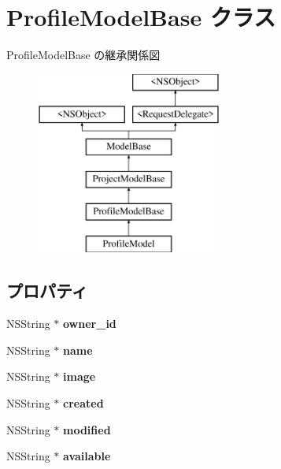\hypertarget{interface_profile_model_base}{}\section{Profile\+Model\+Base クラス}
\label{interface_profile_model_base}
Profile\+Model\+Base の継承関係図\begin{figure}[H]
\begin{center}
\leavevmode
\includegraphics[height=6.000000cm]{interface_profile_model_base}
\end{center}
\end{figure}
\subsection*{プロパティ}
\begin{DoxyCompactItemize}
\item 
\hypertarget{interface_profile_model_base_a549a48724d174bfd47f7c42b907f2b65}{}N\+S\+String $\ast$ {\bfseries owner\+\_\+id}\label{interface_profile_model_base_a549a48724d174bfd47f7c42b907f2b65}

\item 
\hypertarget{interface_profile_model_base_a22ef66a4d154ab4948796f01cd2e72bc}{}N\+S\+String $\ast$ {\bfseries name}\label{interface_profile_model_base_a22ef66a4d154ab4948796f01cd2e72bc}

\item 
\hypertarget{interface_profile_model_base_a6ca30c6a2fdee19f27ef3221eb593c4c}{}N\+S\+String $\ast$ {\bfseries image}\label{interface_profile_model_base_a6ca30c6a2fdee19f27ef3221eb593c4c}

\item 
\hypertarget{interface_profile_model_base_a45c5377eac8af21f249a50c32250e82e}{}N\+S\+String $\ast$ {\bfseries created}\label{interface_profile_model_base_a45c5377eac8af21f249a50c32250e82e}

\item 
\hypertarget{interface_profile_model_base_aed5f2d6ba5d0c40dd0fe7e2f4ead8eff}{}N\+S\+String $\ast$ {\bfseries modified}\label{interface_profile_model_base_aed5f2d6ba5d0c40dd0fe7e2f4ead8eff}

\item 
\hypertarget{interface_profile_model_base_a13503bce89dc2b99e66de948d955b752}{}N\+S\+String $\ast$ {\bfseries available}\label{interface_profile_model_base_a13503bce89dc2b99e66de948d955b752}

\end{DoxyCompactItemize}
